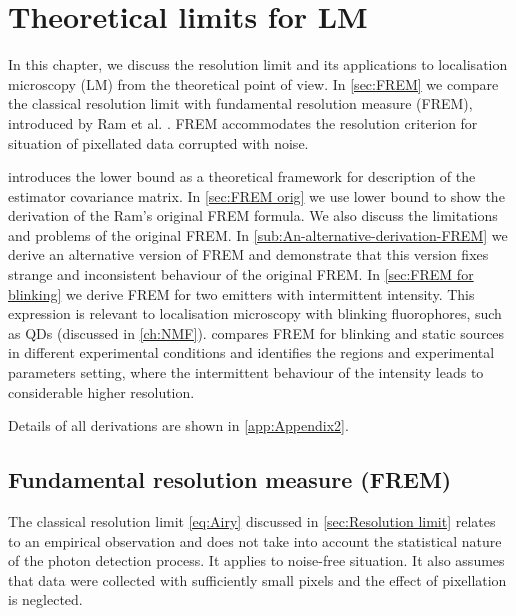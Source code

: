 \chapter{Theoretical limits for LM \label{ch:Theoretical-limits-of the LM}}

In this chapter, we discuss the resolution limit and its applications to localisation microscopy (LM) from the theoretical point of view. In \autoref{sec:FREM} we compare the classical resolution limit with fundamental resolution measure (FREM), introduced by Ram et al. \cite{Ram2006}. FREM accommodates the resolution criterion for situation of pixellated data corrupted with noise.

 introduces the \CR lower bound as a theoretical framework for description of the estimator covariance matrix. In \autoref{sec:FREM orig} we use \CR lower bound to show the derivation of the Ram's original FREM formula. We also discuss the limitations and problems of the original FREM. In \autoref{sub:An-alternative-derivation-FREM} we derive an alternative version of FREM and demonstrate that this version fixes strange and inconsistent behaviour of the original FREM. In \autoref{sec:FREM for blinking} we derive FREM for two emitters with intermittent intensity. This expression is relevant to localisation microscopy with blinking fluorophores, such as QDs (discussed in \autoref{ch:NMF}).  compares FREM for blinking and static sources in different experimental conditions and identifies the regions and experimental parameters setting, where the intermittent behaviour of the intensity leads to considerable higher resolution. 

Details of all derivations are shown in \autoref{app:Appendix2}.

\section{Fundamental resolution measure (FREM)\label{sec:FREM}}

The classical resolution limit \autoref{eq:Airy} discussed in \autoref{sec:Resolution limit} relates to an empirical observation and does not take into account the statistical nature of the photon detection process. It applies to noise-free situation. It also assumes that data were collected with sufficiently small pixels and the effect of pixellation is neglected. 

